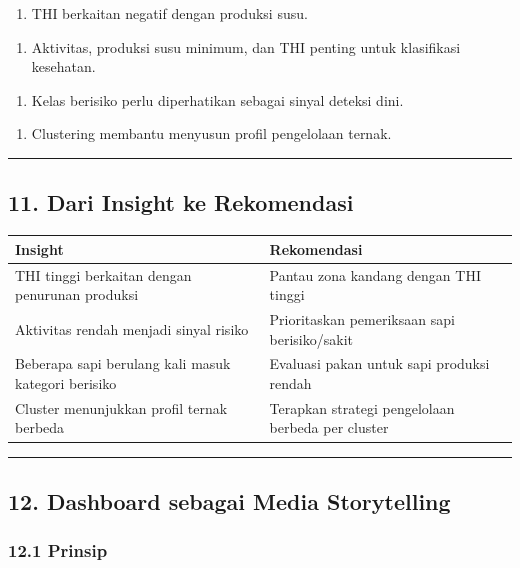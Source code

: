 \documentclass[12pt,a4paper]{article}
\begin{document}
\begin{enumerate}
\item THI berkaitan negatif dengan produksi susu.
\end{enumerate}

\begin{enumerate}
\item Aktivitas, produksi susu minimum, dan THI penting untuk klasifikasi kesehatan.
\end{enumerate}

\begin{enumerate}
\item Kelas berisiko perlu diperhatikan sebagai sinyal deteksi dini.
\end{enumerate}

\begin{enumerate}
\item Clustering membantu menyusun profil pengelolaan ternak.
\end{enumerate}


\hrule


\subsection{11. Dari Insight ke Rekomendasi}

\begin{tabular}{|l|l|}
\hline
Insight & Rekomendasi \\
\hline
THI tinggi berkaitan dengan penurunan produksi & Pantau zona kandang dengan THI tinggi \\
\hline
Aktivitas rendah menjadi sinyal risiko & Prioritaskan pemeriksaan sapi berisiko/sakit \\
\hline
Beberapa sapi berulang kali masuk kategori berisiko & Evaluasi pakan untuk sapi produksi rendah \\
\hline
Cluster menunjukkan profil ternak berbeda & Terapkan strategi pengelolaan berbeda per cluster \\
\hline
\end{tabular}


\hrule


\subsection{12. Dashboard sebagai Media Storytelling}

\subsubsection{12.1 Prinsip}
\end{document}
